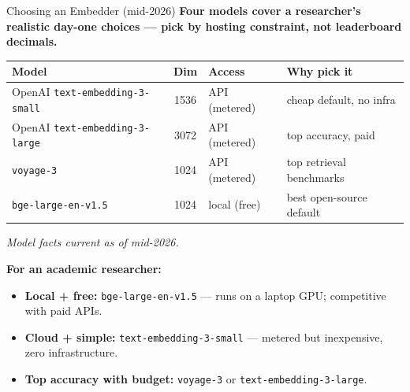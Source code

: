 \begin{frame}{Choosing an Embedder (mid-2026)}
\textbf{Four models cover a researcher's realistic day-one choices --- pick by hosting constraint, not leaderboard decimals.}

\medskip
\begin{center}
\renewcommand{\arraystretch}{1.3}
\small
\begin{tabular}{|l|c|l|l|}
\hline
\textbf{Model} & \textbf{Dim} & \textbf{Access} & \textbf{Why pick it} \\
\hline
OpenAI \texttt{text-embedding-3-small} & 1536 & API (metered) & cheap default, no infra \\
\hline
OpenAI \texttt{text-embedding-3-large} & 3072 & API (metered) & top accuracy, paid \\
\hline
\texttt{voyage-3} & 1024 & API (metered) & top retrieval benchmarks \\
\hline
\texttt{bge-large-en-v1.5} & 1024 & local (free) & best open-source default \\
\hline
\end{tabular}
\end{center}

\smallskip
{\centering\textit{\footnotesize Model facts current as of mid-2026.}\par}

\medskip
\textbf{For an academic researcher:}
\begin{itemize}
\item \textbf{Local + free:} \texttt{bge-large-en-v1.5} --- runs on a laptop GPU; competitive with paid APIs.
\item \textbf{Cloud + simple:} \texttt{text-embedding-3-small} --- metered but inexpensive, zero infrastructure.
\item \textbf{Top accuracy with budget:} \texttt{voyage-3} or \texttt{text-embedding-3-large}.
\end{itemize}
\end{frame}

